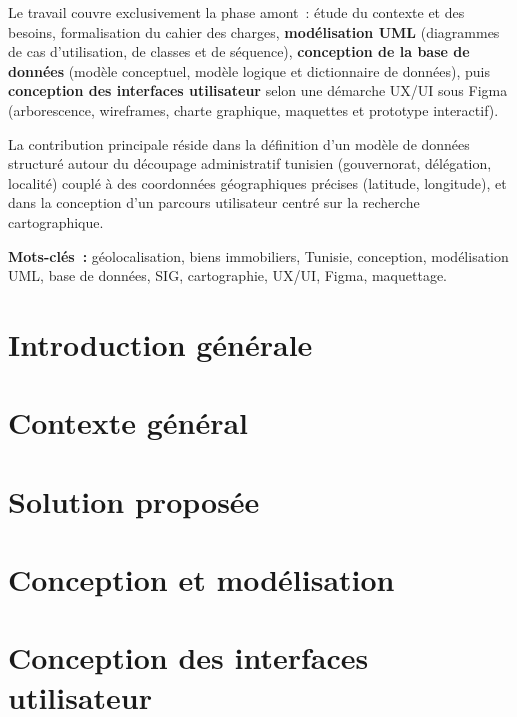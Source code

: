 \documentclass[a4paper, 12pt]{report}
\begin{document}
Le travail couvre exclusivement la phase amont~: étude du contexte et des besoins,
formalisation du cahier des charges, \textbf{modélisation UML} (diagrammes de cas
d'utilisation, de classes et de séquence), \textbf{conception de la base de
données} (modèle conceptuel, modèle logique et dictionnaire de données), puis
\textbf{conception des interfaces utilisateur} selon une démarche UX/UI sous Figma
(arborescence, wireframes, charte graphique, maquettes et prototype interactif).

La contribution principale réside dans la définition d'un modèle de données
structuré autour du découpage administratif tunisien (gouvernorat, délégation,
localité) couplé à des coordonnées géographiques précises (latitude, longitude),
et dans la conception d'un parcours utilisateur centré sur la recherche
cartographique.

\vspace{1.5em}
\noindent\textbf{Mots-clés~:} géolocalisation, biens immobiliers, Tunisie, conception, modélisation UML, base de données, SIG, cartographie, UX/UI, Figma, maquettage.
\clearpage



\chapter{Introduction générale}
\label{chap:intro}


\chapter{Contexte général}
\label{chap:contexte}


\chapter{Solution proposée}
\label{chap:solution}


\chapter{Conception et modélisation}
\label{chap:conception}


\chapter{Conception des interfaces utilisateur}
\label{chap:uxui}

\end{document}
